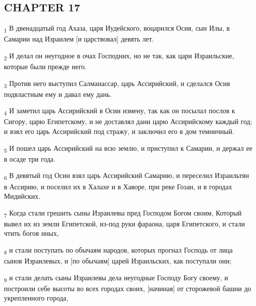 \subsection{CHAPTER 17}
\begin{tcolorbox}
\textsubscript{1} В двенадцатый год Ахаза, царя Иудейского, воцарился Осия, сын Илы, в Самарии над Израилем [и царствовал] девять лет.
\end{tcolorbox}
\begin{tcolorbox}
\textsubscript{2} И делал он неугодное в очах Господних, но не так, как цари Израильские, которые были прежде него.
\end{tcolorbox}
\begin{tcolorbox}
\textsubscript{3} Против него выступил Салманассар, царь Ассирийский, и сделался Осия подвластным ему и давал ему дань.
\end{tcolorbox}
\begin{tcolorbox}
\textsubscript{4} И заметил царь Ассирийский в Осии измену, так как он посылал послов к Сигору, царю Египетскому, и не доставлял дани царю Ассирийскому каждый год; и взял его царь Ассирийский под стражу, и заключил его в дом темничный.
\end{tcolorbox}
\begin{tcolorbox}
\textsubscript{5} И пошел царь Ассирийский на всю землю, и приступил к Самарии, и держал ее в осаде три года.
\end{tcolorbox}
\begin{tcolorbox}
\textsubscript{6} В девятый год Осии взял царь Ассирийский Самарию, и переселил Израильтян в Ассирию, и поселил их в Халахе и в Хаворе, при реке Гозан, и в городах Мидийских.
\end{tcolorbox}
\begin{tcolorbox}
\textsubscript{7} Когда стали грешить сыны Израилевы пред Господом Богом своим, Который вывел их из земли Египетской, из-под руки фараона, царя Египетского, и стали чтить богов иных,
\end{tcolorbox}
\begin{tcolorbox}
\textsubscript{8} и стали поступать по обычаям народов, которых прогнал Господь от лица сынов Израилевых, и [по обычаям] царей Израильских, как поступали они;
\end{tcolorbox}
\begin{tcolorbox}
\textsubscript{9} и стали делать сыны Израилевы дела неугодные Господу Богу своему, и построили себе высоты во всех городах своих, [начиная] от сторожевой башни до укрепленного города,
\end{tcolorbox}
